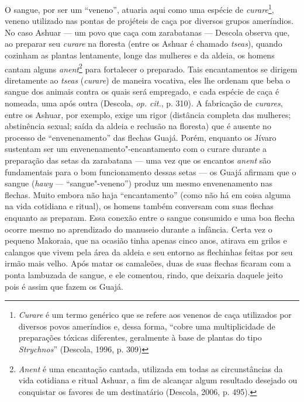 O sangue, por ser um ``veneno'', atuaria aqui como uma espécie de
\emph{curare}\footnote{\emph{Curare} é um termo genérico que se refere
  aos venenos de caça utilizados por diversos povos ameríndios e, dessa
  forma, ``cobre uma multiplicidade de preparações tóxicas diferentes,
      geralmente à base de plantas do tipo \emph{Strychnos}'' (Descola, 1996, p.
  309)}, veneno utilizado nas pontas de projéteis de caça por diversos
grupos ameríndios. No caso Ashuar --- um povo que caça com zarabatanas ---
Descola observa que, ao preparar seu \emph{curare} na floresta (entre os
Ashuar é chamado \emph{tseas}), quando cozinham as plantas lentamente,
longe das mulheres e da aldeia, os homens cantam alguns
\emph{anent}\footnote{\emph{Anent} é uma encantação cantada, utilizada
  em todas as circunstâncias da vida cotidiana e ritual Ashuar, a fim de
  alcançar algum resultado desejado ou conquistar os favores de um
  destinatário (Descola, 2006, p. 495).} para fortalecer o preparado. Tais
encantamentos se dirigem diretamente ao \emph{tseas} (\emph{curare}) de
maneira vocativa, eles lhe ordenam que beba o sangue dos animais contra
os quais será empregado, e cada espécie de caça é nomeada, uma após
outra (Descola, \emph{op. cit.}, p. 310). A fabricação de \emph{curares}, entre
os Ashuar, por exemplo, exige um rigor (distância completa das mulheres;
abstinência sexual; saída da aldeia e reclusão na floresta) que é
ausente no processo de ``envenenamento'' das flechas Guajá. Porém,
enquanto os Jívaro sustentam ser um envenenamento"-encantamento com o
curare durante a preparação das setas da zarabatana --- uma vez que os
encantos \emph{anent} são fundamentais para o bom funcionamento dessas
setas --- os Guajá afirmam que o sangue (\emph{hawy} --- ``sangue"-veneno'')
produz um mesmo envenenamento nas flechas. Muito embora não haja
``encantamento'' (como não há em coisa alguma na vida cotidiana e ritual),
os homens também conversam com suas flechas enquanto as preparam. Essa
conexão entre o sangue consumido e uma boa flecha ocorre mesmo no
aprendizado do manuseio durante a infância. Certa vez o pequeno
Makoraia, que na ocasião tinha apenas cinco anos, atirava em grilos e
calangos que vivem pela área da aldeia e seu entorno as flechinhas
feitas por seu irmão mais velho. Após matar os camaleões, duas de suas
flechas ficaram com a ponta lambuzada de sangue, e ele comentou, rindo,
que deixaria daquele jeito pois é assim que fazem os Guajá.

